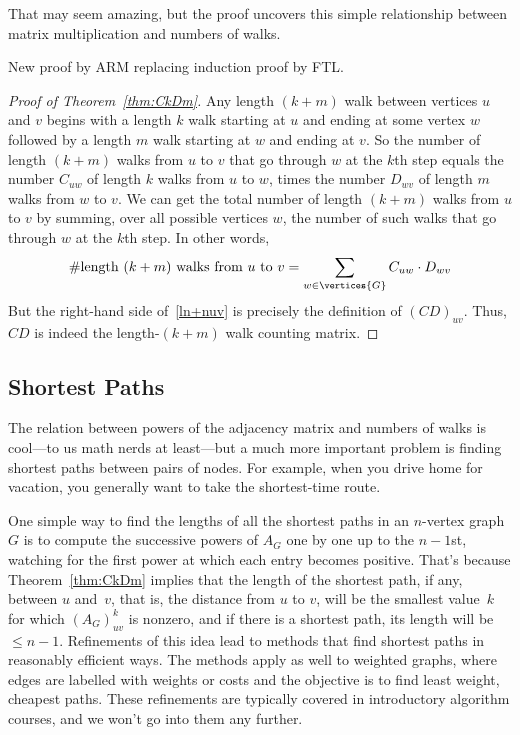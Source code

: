 That may seem amazing, but the proof uncovers this simple relationship
between matrix multiplication and numbers of walks.

\begin{editingnotes}
New proof by ARM replacing induction proof by FTL.
\end{editingnotes}

\begin{proof}[Proof of Theorem~\ref{thm:CkDm}]
  Any length $(k+m)$ walk between vertices $u$ and $v$ begins with a
  length $k$ walk starting at $u$ and ending at some vertex $w$
  followed by a length $m$ walk starting at $w$ and ending at $v$.  So
  the number of length $(k+m)$ walks from $u$ to $v$ that go through
  $w$ at the $k$th step equals the number $C_{uw}$ of length $k$ walks
  from $u$ to $w$, times the number $D_{wv}$ of length $m$ walks from
  $w$ to $v$.  We can get the total number of length $(k+m)$ walks
  from $u$ to $v$ by summing, over all possible vertices $w$, the
  number of such walks that go through $w$ at the $k$th step.  In
  other words,
\begin{equation}\label{ln+nuv}
\text{\#length $(k+m)$ walks from $u$ to $v$} =
              \sum_{w \in \vertices{G}} C_{uw}\cdot D_{wv}
\end{equation}
But the right-hand side of~\eqref{ln+nuv} is precisely the definition of
$(CD)_{uv}$.  Thus, $CD$ is indeed the length-$(k+m)$ walk counting matrix.
\end{proof}


\subsection{Shortest Paths}
The relation between powers of the adjacency matrix and numbers of
walks is cool---to us math nerds at least---but a much more important
problem is finding  shortest paths between
pairs of nodes.  For example, when you drive home for vacation, you
generally want to take the shortest-time route.

One simple way to find the lengths of all the shortest paths in an
$n$-vertex graph $G$ is to compute the successive powers of $A_G$
one by one up to the $n-1$st, watching for the first power at which
each entry becomes positive.  That's because Theorem~\ref{thm:CkDm}
implies that the length of the shortest path, if any, between $u$
and~$v$, that is, the distance from $u$ to $v$, will be the smallest
value~$k$ for which $(A_G)_{uv}^k$ is nonzero, and if there is a
shortest path, its length will be $\leq n-1$.  Refinements of this
idea lead to methods that find shortest paths in reasonably efficient
ways.  The methods apply as well to weighted graphs, where edges are
labelled with weights or costs and the objective is to find least
weight, cheapest paths.  These refinements are typically covered in
introductory algorithm courses, and we won't go into them any
further.

